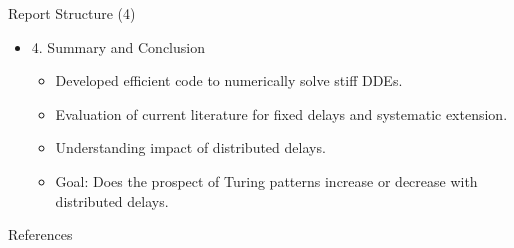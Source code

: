 \documentclass{beamer}
\begin{document}
\begin{frame}{Report Structure (4)}
    \begin{itemize}
        \item 4. Summary and Conclusion
        \begin{itemize}
            \item Developed efficient code to numerically solve stiff DDEs.
            \hfill
            \item Evaluation of current literature for fixed delays and systematic extension.
            \hfill
            \item Understanding impact of distributed delays.
            \hfill
            \item Goal: Does the prospect of Turing patterns increase or decrease with distributed delays.

        \end{itemize}
    \end{itemize}
\end{frame}


\begin{frame}{References}
\AtNextBibliography{\tiny}
\printbibliography
\end{frame}
\end{document}
